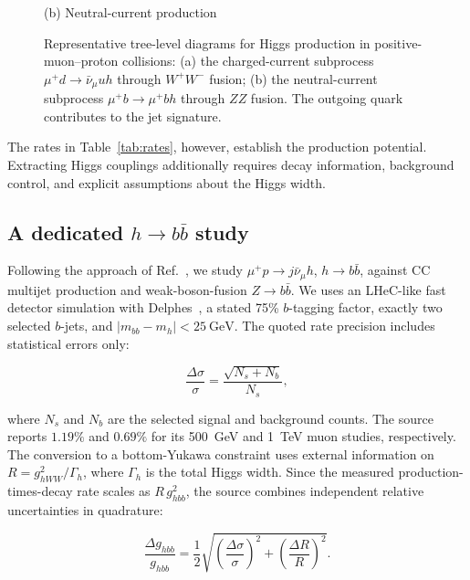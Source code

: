 \documentclass[a4paper,11pt]{article}
\begin{document}
\begin{figure}[htbp]
\begin{minipage}[t]{0.48\textwidth}
\smallskip
{\small (b) Neutral-current production}
\end{minipage}

\caption{Representative tree-level diagrams for Higgs production
in positive-muon--proton collisions:
(a) the charged-current subprocess
$\mu^+d\to\bar\nu_\mu uh$ through $W^+W^-$ fusion;
(b) the neutral-current subprocess
$\mu^+b\to\mu^+bh$ through $ZZ$ fusion.
The outgoing
quark contributes to the jet signature. }
\label{fig:higgs-production}
\end{figure}

The rates in Table~\ref{tab:rates}, however, establish the production
potential. Extracting Higgs couplings additionally requires
decay information, background control, and explicit
assumptions about the Higgs width.






\subsection{A dedicated \texorpdfstring{$h\to b\bar b$}{h to bb} study}


Following the approach of Ref.~\cite{Cheung:2021iev}, we study $\mu^+p\to j\bar\nu_\mu h$, $h\to b\bar b$, against 
CC multijet production and weak-boson-fusion $Z\to b\bar b$. We uses an LHeC-like fast detector simulation 
with Delphes~\cite{deFavereau:2013fsa}, a stated 75\% $b$-tagging factor, exactly two selected $b$-jets, 
and $|m_{bb}-m_h|<25~\mathrm{GeV}$. The quoted rate precision includes statistical errors only:

\begin{equation}
\frac{\Delta\sigma}{\sigma}=\frac{\sqrt{N_s+N_b}}{N_s},
\label{eq:stat}
\end{equation}

where $N_s$ and $N_b$ are the selected signal and background counts. 
The source reports $1.19\%$ and $0.69\%$ for its 500~GeV and 1~TeV muon studies, 
respectively. 
The conversion to a bottom-Yukawa constraint uses external information on $R=g_{hWW}^2/\Gamma_h$, 
where $\Gamma_h$ is the total Higgs width. 
Since the measured production-times-decay rate scales as $R\,g_{hbb}^2$, the source combines 
independent relative uncertainties in quadrature: 

\begin{equation}
\frac{\Delta g_{hbb}}{g_{hbb}}
=\frac12\sqrt{\left(\frac{\Delta\sigma}{\sigma}\right)^2+
\left(\frac{\Delta R}{R}\right)^2}.
\label{eq:coupling}
\end{equation}
\end{document}
